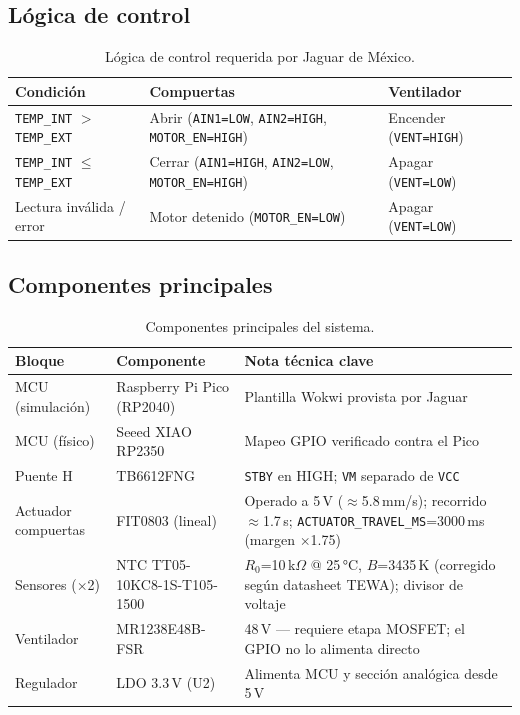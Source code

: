 \documentclass[11pt,letterpaper]{article}
\begin{document}
\subsection{Lógica de control}
\begin{table}[H]
\centering\small
{}
\begin{tabularx}{\textwidth}{L{4.2cm} X X}
\toprule
{}\color{white}\textbf{Condición} & \color{white}\textbf{Compuertas} & \color{white}\textbf{Ventilador} \\
\midrule
\texttt{TEMP\_INT} $>$ \texttt{TEMP\_EXT} & Abrir (\texttt{AIN1=LOW}, \texttt{AIN2=HIGH}, \texttt{MOTOR\_EN=HIGH}) & Encender (\texttt{VENT=HIGH}) \\
\texttt{TEMP\_INT} $\leq$ \texttt{TEMP\_EXT} & Cerrar (\texttt{AIN1=HIGH}, \texttt{AIN2=LOW}, \texttt{MOTOR\_EN=HIGH}) & Apagar (\texttt{VENT=LOW}) \\
Lectura inválida / error & Motor detenido (\texttt{MOTOR\_EN=LOW}) & Apagar (\texttt{VENT=LOW}) \\
\bottomrule
\end{tabularx}
\caption{Lógica de control requerida por Jaguar de México.}
\end{table}

\subsection{Componentes principales}
\begin{table}[H]
\centering\small
{}
\begin{tabularx}{\textwidth}{L{3.4cm} L{4.2cm} X}
\toprule
{}\color{white}\textbf{Bloque} & \color{white}\textbf{Componente} & \color{white}\textbf{Nota técnica clave} \\
\midrule
MCU (simulación) & Raspberry Pi Pico (RP2040) & Plantilla Wokwi provista por Jaguar \\
MCU (físico) & Seeed XIAO RP2350 & Mapeo GPIO verificado contra el Pico \\
Puente H & TB6612FNG & \texttt{STBY} en HIGH; \texttt{VM} separado de \texttt{VCC} \\
Actuador compuertas & FIT0803 (lineal) & Operado a 5\,V ($\approx$5.8\,mm/s); recorrido $\approx$1.7\,s; \texttt{ACTUATOR\_TRAVEL\_MS}=3000\,ms (margen $\times$1.75) \\
Sensores ($\times$2) & NTC TT05-10KC8-1S-T105-1500 & $R_0$=10\,k$\Omega$ @ 25\,°C, $B$=3435\,K (corregido según datasheet TEWA); divisor de voltaje \\
Ventilador & MR1238E48B-FSR & 48\,V --- requiere etapa MOSFET; el GPIO no lo alimenta directo \\
Regulador & LDO 3.3\,V (U2) & Alimenta MCU y sección analógica desde 5\,V \\
\bottomrule
\end{tabularx}
\caption{Componentes principales del sistema.}
\end{table}
\end{document}
